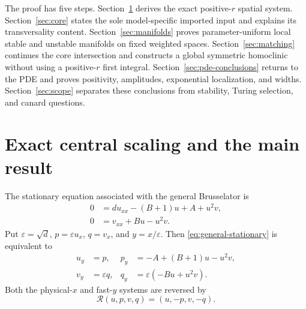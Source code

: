 \documentclass[11pt,reqno]{amsart}
\numberwithin{equation}{section}
\theoremstyle{remark}
\newcommand{\cR}{\mathcal R}
\begin{document}
The proof has five steps.  Section~\ref{sec:scaling} derives the exact
positive-$r$ spatial system.  Section~\ref{sec:core} states the sole
model-specific imported input and explains its transversality content.
Section~\ref{sec:manifolds} proves parameter-uniform local stable and unstable
manifolds on fixed weighted spaces.  Section~\ref{sec:matching} continues the
core intersection and constructs a global symmetric homoclinic without using
a positive-$r$ first integral.  Section~\ref{sec:pde-conclusions} returns to
the PDE and proves positivity, amplitudes, exponential localization, and
widths.  Section~\ref{sec:scope} separates these conclusions from stability,
Turing selection, and canard questions.

\section{Exact central scaling and the main result}\label{sec:scaling}

The stationary equation associated with the general Brusselator is
\begin{equation}\label{eq:general-stationary}
 \begin{aligned}
 0&=d u_{xx}-(B+1)u+A+u^2v,\\
 0&=v_{xx}+Bu-u^2v.
 \end{aligned}
\end{equation}
Put $\varepsilon=\sqrt d$, $p=\varepsilon u_x$, $q=v_x$, and
$y=x/\varepsilon$.  Then \eqref{eq:general-stationary} is equivalent to
\begin{equation}\label{eq:fast-system}
 \begin{aligned}
 u_y&=p,& p_y&=-A+(B+1)u-u^2v,\\
 v_y&=\varepsilon q,& q_y&=\varepsilon(-Bu+u^2v).
 \end{aligned}
\end{equation}
Both the physical-$x$ and fast-$y$ systems are reversed by
\begin{equation}\label{eq:physical-reverser}
 \cR(u,p,v,q)=(u,-p,v,-q).
\end{equation}
\end{document}
